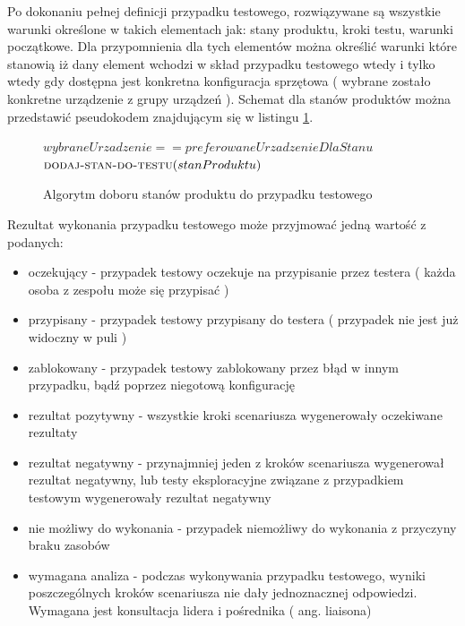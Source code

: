 Po dokonaniu pełnej definicji przypadku testowego, rozwiązywane są wszystkie warunki określone w takich elementach jak: stany produktu, kroki testu, warunki początkowe. Dla przypomnienia dla tych elementów można określić warunki które stanowią iż dany element wchodzi w skład przypadku testowego wtedy i tylko wtedy gdy dostępna jest konkretna konfiguracja sprzętowa ( wybrane zostało konkretne urządzenie z grupy urządzeń ). Schemat dla stanów produktów można przedstawić pseudokodem znajdującym się w listingu \ref{lst:doborWarunkow}.
\begin{figure}[h]
	\begin{codebox}
	\li {}
	\li \Do   
	\li \Do
	     \If $wybraneUrzadzenie  ==  preferowaneUrzadzenieDlaStanu$
	\li     \Then
	           $\textnormal{\scshape dodaj-stan-do-testu}(stanProduktu)$	         	         
	        \End	        
	\li  \End	 
	\li
	  \End
	  
	\end{codebox}
	\caption{ Algorytm doboru stanów produktu do przypadku testowego }
	\label{lst:doborWarunkow}
\end{figure}
\newpage

Rezultat wykonania przypadku testowego może przyjmować jedną wartość z podanych:
\begin{itemize}
   \item oczekujący - przypadek testowy oczekuje na przypisanie przez testera ( każda osoba z zespołu może się przypisać )
   \item przypisany - przypadek testowy przypisany do testera ( przypadek nie jest już widoczny w puli )
   \item zablokowany - przypadek testowy zablokowany przez błąd w innym przypadku, bądź poprzez niegotową konfigurację
   \item rezultat pozytywny - wszystkie kroki scenariusza wygenerowały oczekiwane rezultaty
   \item rezultat negatywny - przynajmniej jeden z kroków scenariusza wygenerował rezultat negatywny, lub testy eksploracyjne związane z przypadkiem testowym wygenerowały rezultat negatywny
   \item nie możliwy do wykonania - przypadek niemożliwy do wykonania z przyczyny braku zasobów
   \item wymagana analiza - podczas wykonywania przypadku testowego, wyniki poszczególnych kroków scenariusza nie dały jednoznacznej odpowiedzi. Wymagana jest konsultacja lidera i pośrednika ( ang. liaisona)
 \end{itemize} 


